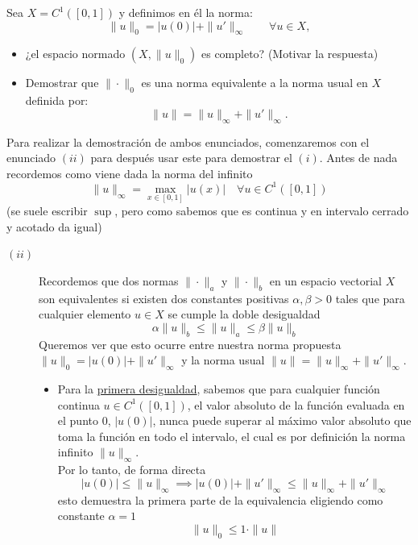 \begin{ejercicio}
    Sea $X = C^1([0,1])$ y definimos en él la norma:
    \[ \|u\|_0 = |u(0)| + \|u'\|_\infty \qquad \forall u \in X, \]
    \begin{itemize}
        \item[i)] ¿el espacio normado $(X, \|u\|_0)$ es completo? (Motivar la respuesta)
        \item[ii)] Demostrar que $\|\cdot\|_0$ es una norma equivalente a la norma usual en $X$ definida por:
        \[ \|u\| = \|u\|_\infty + \|u'\|_\infty. \]
    \end{itemize}
    Para realizar la demostración de ambos enunciados, comenzaremos con el enunciado $(ii)$ para después usar este para demostrar el $(i)$. Antes de nada recordemos como viene dada la norma del infinito
    $$\|u\|_\infty = \max_{x \in [0,1]} |u(x)|\quad \forall u \in C^1([0,1])$$
    (se suele escribir $\sup$, pero como sabemos que es continua y en intervalo cerrado y acotado da igual)
    \begin{description}
        \item[$(ii)$] Recordemos que dos normas $\|\cdot\|_a$ y $\|\cdot\|_b$ en un espacio vectorial $X$ son equivalentes si existen dos constantes positivas $\alpha, \beta > 0$ tales que para cualquier elemento $u \in X$ se cumple la doble desigualdad
        $$\alpha \|u\|_b \le \|u\|_a \le \beta \|u\|_b$$
        Queremos ver que esto ocurre entre nuestra norma propuesta $\|u\|_0 = |u(0)| + \|u'\|_\infty$ y la norma usual $\|u\| = \|u\|_\infty + \|u'\|_\infty$.

        \begin{itemize}
            \item Para la \underline{primera desigualdad}, sabemos que para cualquier función continua $u \in C^1([0,1])$, el valor absoluto de la función evaluada en el punto $0$, $|u(0)|$, nunca puede superar al máximo valor absoluto que toma la función en todo el intervalo, el cual es por definición la norma infinito $\|u\|_\infty$. \\
            
            \noindent
            Por lo tanto, de forma directa
            $$|u(0)| \le \|u\|_\infty\implies |u(0)| + \|u'\|_\infty \le \|u\|_\infty + \|u'\|_\infty$$
            esto demuestra la primera parte de la equivalencia eligiendo como constante $\alpha = 1$
            $$\|u\|_0 \le 1 \cdot \|u\| $$


\end{itemize}
\end{description}
\end{ejercicio}
